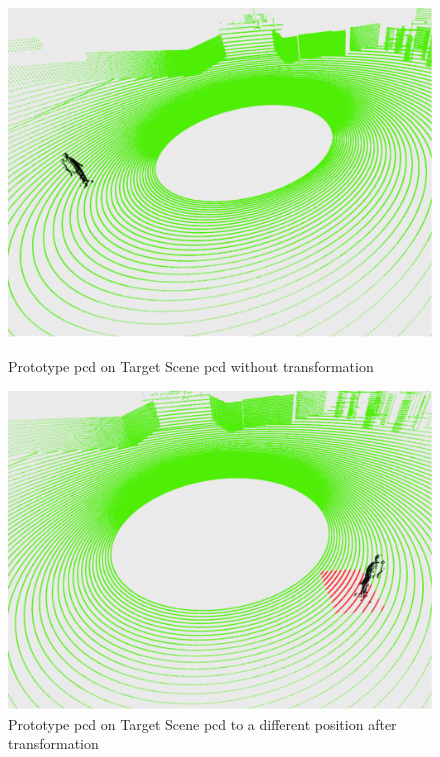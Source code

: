 \begin{figure}[htbp]
    \centering
    \begin{minipage}[b]{0.45\textwidth}
    \centering
    \includegraphics[width=1\linewidth]{97_graphics/results/prototype_on_target_scene_original_location.pdf}
    \caption{Prototype \acrshort{pcd} on Target Scene \acrshort{pcd} without transformation}
    \label{fig:result-prototype_on_target_scene_original_location}
    \end{minipage}
    \hfill
    \begin{minipage}[b]{0.45\textwidth}
    \centering
    \includegraphics[width=1\linewidth]{97_graphics/results/prototype_on_target_scene_different_location.pdf}
    \caption{Prototype \acrshort{pcd} on Target Scene \acrshort{pcd} to a different position after transformation}
    \label{fig:result-prototype_on_target_scene_different_location}
    \end{minipage}
\end{figure}

